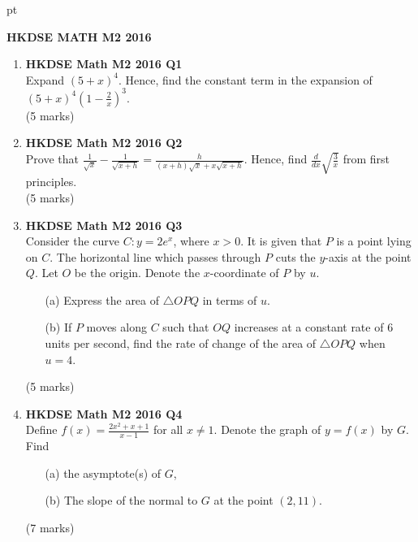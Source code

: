 \documentclass[12pt]{article}
\begin{document}
 pt
\begin{center}
	{\large \bf HKDSE MATH M2 2016}\\
	\vspace{2 mm}

\end{center}
\vspace{0.05cm}

\begin{enumerate}
	\item \textbf{HKDSE Math M2 2016 Q1}\\
	Expand $(5+x)^4$. Hence, find the constant term in the expansion of $(5+x)^4\left(1-\displaystyle\frac{2}{x}\right)^3$. \\(5 marks)

	\item \textbf{HKDSE Math M2 2016 Q2}\\
	Prove that $\displaystyle\frac{1}{\sqrt{x}} - \frac{1}{\sqrt{x+h}} = \frac{h}{(x+h)\sqrt{x} + x\sqrt{x+h}}$. Hence, find $\displaystyle \frac{d}{dx} \sqrt{\displaystyle\frac{3}{x}}$ from first principles. \\(5 marks)

	\item \textbf{HKDSE Math M2 2016 Q3}\\
	Consider the curve $C : y = 2e^x$, where $x>0$. It is given that $P$ is a point lying on $C$. The horizontal line which passes through $P$ cuts the $y$-axis at the point $Q$. Let $O$ be the origin. Denote the $x$-coordinate of $P$ by $u$. 
	\begin{enumerate}
		\item [(a)]Express the area of $\triangle OPQ$ in terms of $u$.
		\item [(b)]If $P$ moves along $C$ such that $OQ$ increases at a constant rate of $6$ units per second, find the rate of change of the area of $\triangle OPQ$ when $u=4$.
	\end{enumerate}
	(5 marks)

	\item \textbf{HKDSE Math M2 2016 Q4}\\
	Define $f(x) = \displaystyle\frac{2x^2 + x + 1}{x - 1}$ for all $x \neq 1$. Denote the graph of $y = f(x)$ by $G$. Find 
	\begin{enumerate}
		\item [(a)]the asymptote(s) of $G$,
		\item [(b)]The slope of the normal to $G$ at the point $(2,11)$.
	\end{enumerate}
	(7 marks)


\end{enumerate}
\end{document}
